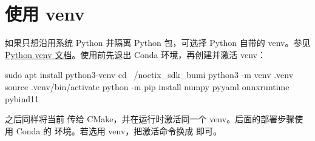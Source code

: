\section{使用 venv}
如果只想沿用系统 Python 并隔离 Python 包，可选择 Python 自带的 venv。参见\href{https://docs.python.org/3.10/library/venv.html}{Python venv 文档}。使用前先退出 Conda 环境，再创建并激活 venv：
\begin{command}
sudo apt install python3-venv
cd ~/noetix_sdk_bumi
python3 -m venv .venv
source .venv/bin/activate
python -m pip install numpy pyyaml onnxruntime pybind11
\end{command}
之后同样将当前  传给 CMake，并在运行时激活同一个 venv。后面的部署步骤使用 Conda 的  环境。若选用 venv，把激活命令换成  即可。
